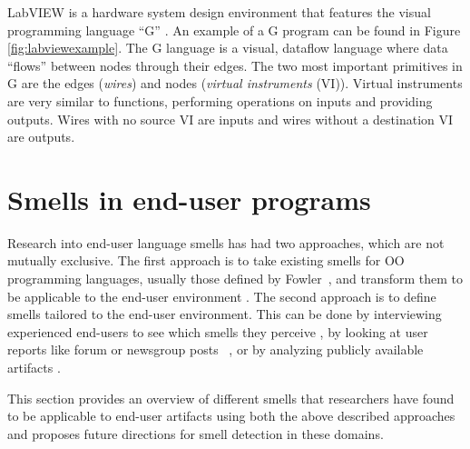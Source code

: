 \documentclass[10pt,conference,compsocconf]{IEEEtran}
\begin{document}
LabVIEW is a hardware system design environment that features the visual programming language ``G'' . 
An example of a G program can be found in Figure \ref{fig:labviewexample}.
The G language is a visual, dataflow language where data ``flows'' between nodes through their edges.
The two most important primitives in G are the edges  (\textit{wires}) and nodes  (\textit{virtual instruments} (VI)).
Virtual instruments are very similar to functions,  performing  operations on inputs and providing outputs.
Wires with no source VI are inputs and wires without a destination VI are outputs. 


\section{Smells in end-user programs}
\label{sec:smells}
Research into end-user language smells has had two approaches, which are not mutually exclusive.
The first approach is to take existing smells for OO programming languages, usually those defined by Fowler~\cite{Fowl1999}, and transform them to be applicable to the end-user environment \cite{Hermans2012inter,Hermans2012intra,Stolee2011,StoleeTSE2013, chambers2013smell}.
The second approach is to define smells tailored to the end-user environment.
This can be done by interviewing experienced end-users to see which smells they perceive \cite{chambers2013smell}, by looking at user reports like forum or newsgroup posts~ \cite{badame2012refactoring,chambers2013smell}, or by analyzing publicly available artifacts \cite{Stolee2011,StoleeTSE2013}.

This section provides an overview of different smells that researchers have found to be applicable to end-user artifacts using both the above described approaches and proposes future directions for smell detection in these domains. 
\end{document}
